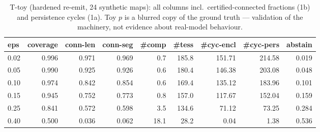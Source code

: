\begin{table}[t]
\centering
\caption{T-toy (hardened re-emit, 24 synthetic maps): all columns incl.\ certified-connected fractions (1b) and persistence cycles (1a). Toy $p$ is a blurred copy of the ground truth --- validation of the machinery, not evidence about real-model behaviour.}
\label{tab:toy}
\small
\begin{tabular}{lrrrrrrrr}
\toprule
\textbf{eps} & \textbf{coverage} & \textbf{conn-len} & \textbf{conn-seg} & \textbf{\#comp} & \textbf{\#tess} & \textbf{\#cyc-encl} & \textbf{\#cyc-pers} & \textbf{abstain} \\
\midrule
0.02 & 0.996 & 0.971 & 0.969 & 0.7 & 185.8 & 151.71 & 214.58 & 0.019 \\
0.05 & 0.990 & 0.925 & 0.926 & 0.6 & 180.4 & 146.38 & 203.08 & 0.048 \\
0.10 & 0.974 & 0.842 & 0.854 & 0.6 & 169.4 & 135.12 & 183.96 & 0.101 \\
0.15 & 0.945 & 0.752 & 0.773 & 0.8 & 157.0 & 117.67 & 152.04 & 0.159 \\
0.25 & 0.841 & 0.572 & 0.598 & 3.5 & 134.6 & 71.12 & 73.25 & 0.284 \\
0.40 & 0.500 & 0.036 & 0.062 & 18.1 & 28.2 & 0.04 & 1.38 & 0.536 \\
\bottomrule
\end{tabular}
\end{table}
